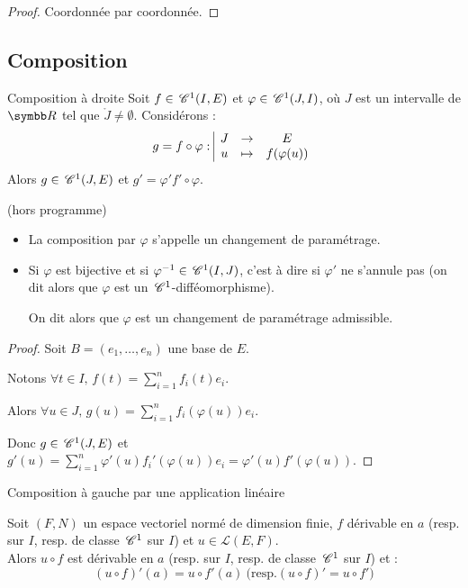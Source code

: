 \begin{proof}
    Coordonnée par coordonnée.
\end{proof}

\subsection{Composition}

\begin{proposition}{Composition à droite}{}
    Soit $f \in \,\mathscr C^{1} (I, E)$ et $\varphi \in \,\mathscr C^{1} (J, I)$, où $J$ est un intervalle de $\R$
    tel que $\mathring{J } \neq \emptyset$. 
    Considérons :
    \[g = f \circ \varphi: \space \begin{array}{|ccc} \displaystyle J & \to & \displaystyle E \\ \displaystyle u & \mapsto & \displaystyle f(\varphi(u)) \end{array}\]
    Alors $g \in \,\mathscr C^{1} (J, E)$ et $g' = \varphi' f' \circ \varphi$.
\end{proposition}

\begin{remarque}
    (hors programme)
    \begin{itemize}
        \item La composition par $\varphi$ s'appelle un changement de paramétrage.

        \item Si $\varphi$ est bijective et si $\varphi^{-1} \in \,\mathscr C^{1} (I, J)$, c'est à dire si 
        $\varphi '$ ne s'annule pas (on dit alors que $\varphi$ est un $\,\mathscr C^{1} $-difféomorphisme). 

        On dit alors que $\varphi$ est un changement de paramétrage admissible.
    \end{itemize}
\end{remarque}

\begin{proof}
    Soit $B = (e_1, \ldots, e_n)$ une base de $E$. 

    Notons $\displaystyle \forall t \in I, \, f(t) = \sum_{i=1}^n f_i(t)e_i$. 

    Alors $\displaystyle \forall u \in J, \, g(u ) = \sum_{i=1}^n f_i(\varphi(u))e_i$. 

    Donc $g \in \,\mathscr C^{1}(J, E)$ et $\displaystyle g'(u) = \sum_{i=1}^n \varphi'(u)f_i'(\varphi(u))e_i = \varphi'(u)f'(\varphi(u))$.
\end{proof}

\begin{theoreme}{Composition à gauche par une application linéaire}{}

    Soit $(F, N)$ un espace vectoriel normé de dimension finie, $f$ dérivable en $a$
    (resp. sur $I$, resp. de classe $\,\mathscr C^{1}$ sur $I$) et $u \in \mathscr{L }(E, F)$. \\

    Alors $u \circ f$ est dérivable en $a$ (resp. sur $I$, resp. de classe $\,\mathscr C^{1}$ sur $I$) et :
    \[(u \circ f)'(a) = u \circ f'(a)~\text{(resp.} (u \circ f)' = u \circ f'\text{)}\]
\end{theoreme}

